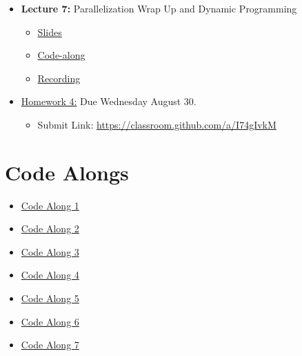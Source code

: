 \documentclass[
]{book}
\providecommand{\tightlist}{%
  \setlength{\itemsep}{0pt}\setlength{\parskip}{0pt}}
\begin{document}
\begin{itemize}
\tightlist
\item
  \textbf{Lecture 7:} Parallelization Wrap Up and Dynamic Programming

  \begin{itemize}
  \tightlist
  \item
    \href{https://kevinghunt.github.io/ComputationCamp/lectures/Lecture7.html}{Slides}
  \item
    \href{https://kevinghunt.github.io/ComputationCamp/codealongs/CodeAlong7.jl}{Code-along}
  \item
    \href{https://uwmadison.zoom.us/rec/share/Kc-WI7JPGEGTFpzW3ojmF0rlotNeRWXARrBrn_ZKzJngDLPBvufu095gegV1knuK.2PadjwKTojeFnyL3}{Recording}
  \end{itemize}
\item
  \href{https://kevinghunt.github.io/ComputationCamp/homeworks/homework4.html}{Homework 4:} Due Wednesday August 30.

  \begin{itemize}
  \tightlist
  \item
    Submit Link: \url{https://classroom.github.com/a/I74gIvkM}
  \end{itemize}
\end{itemize}

\hypertarget{code-alongs}{%
\chapter{Code Alongs}\label{code-alongs}}

\begin{itemize}
\tightlist
\item
  \href{https://kevinghunt.github.io/ComputationCamp/codealongs/CodeAlong1.jl}{Code Along 1}
\item
  \href{https://kevinghunt.github.io/ComputationCamp/codealongs/CodeAlong2.jl}{Code Along 2}
\item
  \href{https://kevinghunt.github.io/ComputationCamp/codealongs/CodeAlong3.jl}{Code Along 3}
\item
  \href{https://kevinghunt.github.io/ComputationCamp/codealongs/CodeAlong4.jl}{Code Along 4}
\item
  \href{https://kevinghunt.github.io/ComputationCamp/codealongs/CodeAlong5.jl}{Code Along 5}
\item
  \href{https://kevinghunt.github.io/ComputationCamp/codealongs/CodeAlong6.jl}{Code Along 6}
\item
  \href{https://kevinghunt.github.io/ComputationCamp/codealongs/CodeAlong7.jl}{Code Along 7}
\end{itemize}

  
\end{document}
